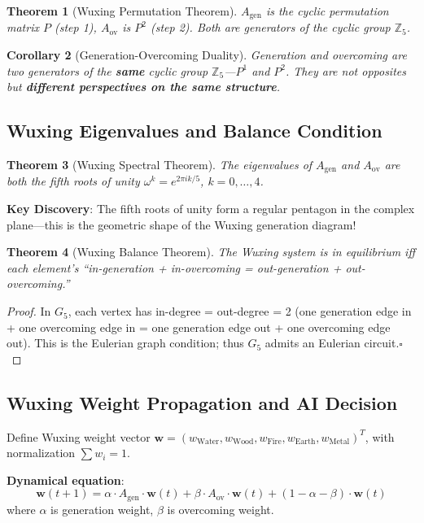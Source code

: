 \documentclass[conference]{IEEEtran}
\newtheorem{theorem}{Theorem}[section]
\newtheorem{corollary}[theorem]{Corollary}
\theoremstyle{remark}
\newcommand{\Z}{\mathbb{Z}}
\begin{document}
\begin{theorem}[Wuxing Permutation Theorem]
$A_{\text{gen}}$ is the cyclic permutation matrix $P$ (step 1), $A_{\text{ov}}$ is $P^2$ (step 2). Both are generators of the cyclic group $\Z_5$.
\end{theorem}

\begin{corollary}[Generation-Overcoming Duality]
Generation and overcoming are two generators of the \textbf{same} cyclic group $\Z_5$---$P^1$ and $P^2$. They are not opposites but \textbf{different perspectives on the same structure}.
\end{corollary}

\subsection{Wuxing Eigenvalues and Balance Condition}

\begin{theorem}[Wuxing Spectral Theorem]
The eigenvalues of $A_{\text{gen}}$ and $A_{\text{ov}}$ are both the fifth roots of unity $\omega^k = e^{2\pi i k/5}$, $k=0,\ldots,4$.
\end{theorem}

\textbf{Key Discovery}: The fifth roots of unity form a regular pentagon in the complex plane---this is the geometric shape of the Wuxing generation diagram!

\begin{theorem}[Wuxing Balance Theorem]
The Wuxing system is in equilibrium iff each element's ``in-generation + in-overcoming = out-generation + out-overcoming.''
\end{theorem}
\begin{proof}
In $G_5$, each vertex has in-degree = out-degree = 2 (one generation edge in + one overcoming edge in = one generation edge out + one overcoming edge out). This is the Eulerian graph condition; thus $G_5$ admits an Eulerian circuit.\hfill$\square$
\end{proof}

\subsection{Wuxing Weight Propagation and AI Decision}

Define Wuxing weight vector $\mathbf{w} = (w_{\text{Water}}, w_{\text{Wood}}, w_{\text{Fire}}, w_{\text{Earth}}, w_{\text{Metal}})^T$, with normalization $\sum w_i = 1$.

\textbf{Dynamical equation}:
\[
\mathbf{w}(t+1) = \alpha \cdot A_{\text{gen}} \cdot \mathbf{w}(t) + \beta \cdot A_{\text{ov}} \cdot \mathbf{w}(t) + (1-\alpha-\beta) \cdot \mathbf{w}(t)
\]
where $\alpha$ is generation weight, $\beta$ is overcoming weight.
\end{document}
